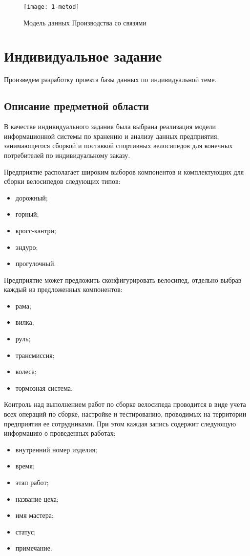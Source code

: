 \begin{figure}[ht]
	\centering
	\texttt{[image: 1-metod]}
	\caption{Модель данных Производства со связями}
	\label{fig:1-metod}
\end{figure}
\section{Индивидуальное задание}
Произведем разработку проекта базы данных по индивидуальной теме.
\subsection{Описание предметной области}
В качестве индивидуального задания была выбрана реализация модели информационной системы по хранению и анализу данных  предприятия, занимающегося сборкой и поставкой спортивных велосипедов для конечных потребителей по индивидуальному заказу.

Предприятие располагает широким выборов компонентов и комплектующих для сборки велосипедов следующих типов:
\begin{itemize}
	\item дорожный;
	\item горный;
	\item кросс-кантри;
	\item эндуро;
	\item прогулочный.
\end{itemize}

Предприятие может предложить сконфигурировать велосипед, отдельно выбрав каждый из предложенных компонентов:
\begin{itemize}
	\item рама;
	\item вилка;
	\item руль;
	\item трансмиссия;
	\item колеса;
	\item тормозная система.
\end{itemize}

Контроль над выполнением работ по сборке велосипеда проводится в виде учета всех операций по сборке, настройке и тестированию, проводимых на территории предприятия ее сотрудниками. При этом каждая запись содержит следующую информацию о проведенных работах:
\begin{itemize}
	\item внутренний номер изделия;
	\item время;
	\item этап работ;
	\item название цеха;
	\item имя мастера;
	\item статус;
	\item примечание.
\end{itemize}

